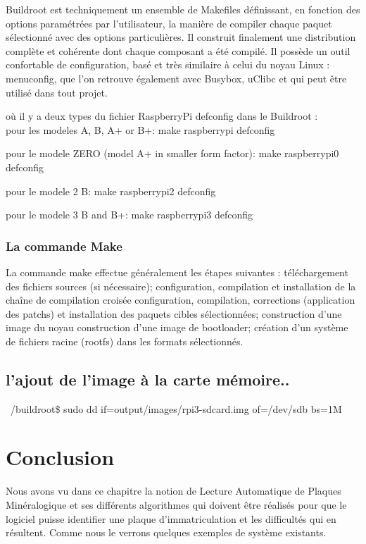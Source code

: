 \documentclass[11pt]{report}
\begin{document}
Buildroot est techniquement un ensemble de Makefiles
définissant, en fonction des options paramétrées par l'utilisateur, la manière de compiler
chaque paquet sélectionné avec des options particulières. Il construit finalement une
distribution complète et cohérente dont chaque composant a été compilé. Il possède un outil
confortable de configuration, basé et très similaire à celui du noyau Linux : menuconfig, que
l'on retrouve également avec Busybox, uClibc et qui peut être utilisé dans tout projet.

où il y a deux types du fichier RaspberryPi defconfig dans le  Buildroot :\\
pour les modeles A, B, A+ or B+:
 make raspberrypi defconfig
 
pour le modele ZERO (model A+ in smaller form factor):
 make raspberrypi0 defconfig
 
pour le modele  2 B:
 make raspberrypi2 defconfig
 
pour le modele 3 B and B+:
 make raspberrypi3 defconfig
 
 
\subsubsection{La commande Make}

La commande make effectue généralement les étapes suivantes : téléchargement des fichiers
sources (si nécessaire); configuration, compilation et installation de la chaîne de compilation
croisée configuration, compilation, corrections (application des patchs) et installation des
paquets cibles sélectionnées; construction d’une image du noyau construction d’une image
de bootloader; création d’un système de fichiers racine (rootfs) dans les formats sélectionnés.
\subsection{l'ajout de l'image à la carte mémoire..}

~/buildroot\$ sudo dd if=output/images/rpi3-sdcard.img of=/dev/sdb bs=1M
\section{Conclusion}
Nous avons vu dans ce chapitre la notion de Lecture Automatique de Plaques
Minéralogique et ses différents algorithmes qui doivent être réalisés pour que le
logiciel puisse identifier une plaque d'immatriculation et les difficultés qui en résultent.
Comme nous le verrons quelques exemples de système existants.
\end{document}
